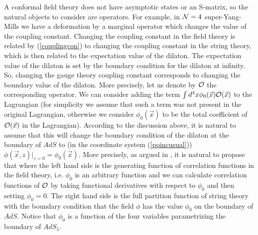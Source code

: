 A conformal field theory does not have asymptotic states or  an
S-matrix, so the natural objects to consider are operators. 
For example, in ${\cal N} =4 $ super-Yang-Mills we 
have a deformation by a
marginal operator which changes the value of the coupling 
constant. Changing the coupling constant in the field theory is
related by (\ref{couplingcon}) to
changing the coupling constant in the string theory, which is then 
related to the expectation value of the dilaton. 
The expectation value of the dilaton is set by the boundary condition 
for the dilaton at infinity. So, changing the gauge theory coupling
constant  corresponds to changing the boundary 
value of the dilaton. More precisely, let us denote by ${\cal O}$ the
corresponding operator. We can consider adding 
 the term $\int d^4 x \phi_0(\vec x) {\cal O}(\vec x) $ to the 
Lagrangian (for simplicity we assume that such a term was not
present in the original Lagrangian, otherwise we consider 
$\phi_0(\vec x)$ to be the total coefficient of ${\cal O}(\vec x)$ in the
Lagrangian). 
According to the discussion above,
it is natural to assume that this will change the boundary 
condition of the dilaton at the boundary of $AdS$ to (in
the coordinate system (\ref{poincusual}))
$ \phi(\vec x, z )|_{z = 0} = \phi_0(\vec x)$. 
More precisely, as argued in \cite{Gubser:1998bc,Witten:1998qj},
 it is natural to propose that
where the left hand side is the generating function of correlation 
functions in the field theory, i.e. $\phi_0$ is an arbitrary function
and we can calculate correlation functions of ${\cal O}$ by taking 
functional derivatives with respect to $\phi_0$ and then setting
$\phi_0 =0$. The right hand side is the full partition function
of string theory with the boundary condition that 
the field $\phi$ has the value $\phi_0$ on the boundary of $AdS$. 
Notice that $\phi_0$ is a function of the four variables parametrizing
the boundary of $AdS_5$.

